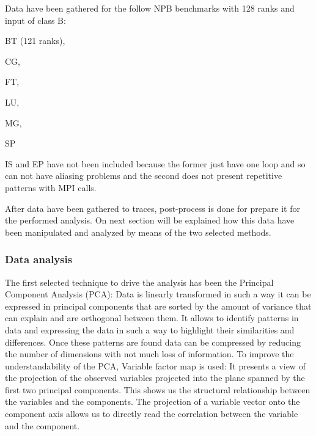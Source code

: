 Data have been gathered for the follow NPB benchmarks with 128 ranks and input
of class B:
\begin{enumerate*}[label=\roman*)]
  \item BT (121 ranks),
  \item CG,
  \item FT,
  \item LU,
  \item MG,
  \item SP
\end{enumerate*}
IS and EP have not been included because the former just have one loop and so
can not have aliasing problems and the second does not present repetitive
patterns with MPI calls.

After data have been gathered to traces, post-process is done for
prepare it for the performed analysis. On next section will be explained 
how this data have been manipulated and analyzed by means of the two selected 
methods. 

\subsubsection{Data analysis}

The first selected technique to drive the analysis has been the Principal 
Component Analysis (PCA): Data is linearly transformed in such a way it can be 
expressed in principal components that are sorted by the amount of variance 
that can explain and are orthogonal between them. It allows to identify patterns 
in data and expressing the data in such a way to highlight their similarities 
and differences. Once these patterns are found data can be compressed by reducing 
the number of dimensions with not much loss of information.  To improve
the understandability of the PCA, Variable factor map is used: It
presents a view of the projection of the observed variables projected into the
plane spanned by the first two principal components. This shows us the
structural relationship between the variables and the components. The projection
of a variable vector onto the component axis allows us to directly read the
correlation between the variable and the component.

